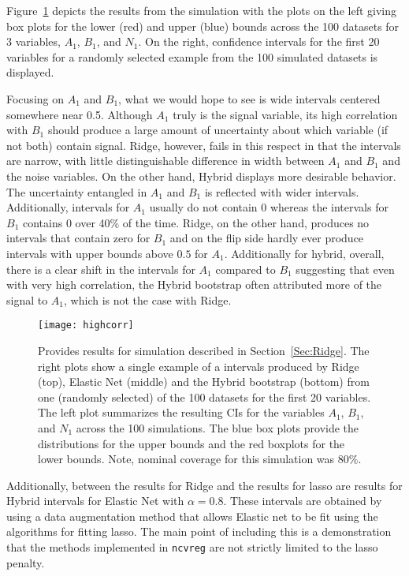 Figure~\ref{Fig:highcorr} depicts the results from the simulation with the plots on the left giving box plots for the lower (red) and upper (blue) bounds across the 100 datasets for 3 variables, $A_1$, $B_1$, and $N_1$. On the right, confidence intervals for the first 20 variables for a randomly selected example from the 100 simulated datasets is displayed.

Focusing on $A_1$ and $B_1$, what we would hope to see is wide intervals centered somewhere near 0.5. Although $A_1$ truly is the signal variable, its high correlation with $B_1$ should produce a large amount of uncertainty about which variable (if not both) contain signal. Ridge, however, fails in this respect in that the intervals are narrow, with little distinguishable difference in width between $A_1$ and $B_1$ and the noise variables. On the other hand, Hybrid displays more desirable behavior. The uncertainty entangled in $A_1$ and $B_1$ is reflected with wider intervals. Additionally, intervals for $A_1$ usually do not contain 0 whereas the intervals for $B_1$ contains 0 over 40\% of the time. Ridge, on the other hand, produces no intervals that contain zero for $B_1$ and on the flip side hardly ever produce intervals with upper bounds above $0.5$ for $A_1$. Additionally for hybrid, overall, there is a clear shift in the intervals for $A_1$ compared to $B_1$ suggesting that even with very high correlation, the Hybrid bootstrap often attributed more of the signal to $A_1$, which is not the case with Ridge.

\begin{figure}[hbtp]
  \begin{center}
  \texttt{[image: highcorr]}
  \caption{\label{Fig:highcorr} Provides results for simulation described in Section~\ref{Sec:Ridge}. The right plots show a single example of a intervals produced by Ridge (top), Elastic Net (middle) and the Hybrid bootstrap (bottom) from one (randomly selected) of the 100 datasets for the first 20 variables. The left plot summarizes the resulting CIs for the variables $A_1$, $B_1$, and $N_1$ across the 100 simulations. The blue box plots provide the distributions for the upper bounds and the red boxplots for the lower bounds. Note, nominal coverage for this simulation was 80\%.}
  \end{center}
\end{figure}

Additionally, between the results for Ridge and the results for lasso are results for Hybrid intervals for Elastic Net with $\alpha = 0.8$. These intervals are obtained by using a data augmentation method that allows Elastic net to be fit using the algorithms for fitting lasso. The main point of including this is a demonstration that the methods implemented in \texttt{ncvreg} are not strictly limited to the lasso penalty.


